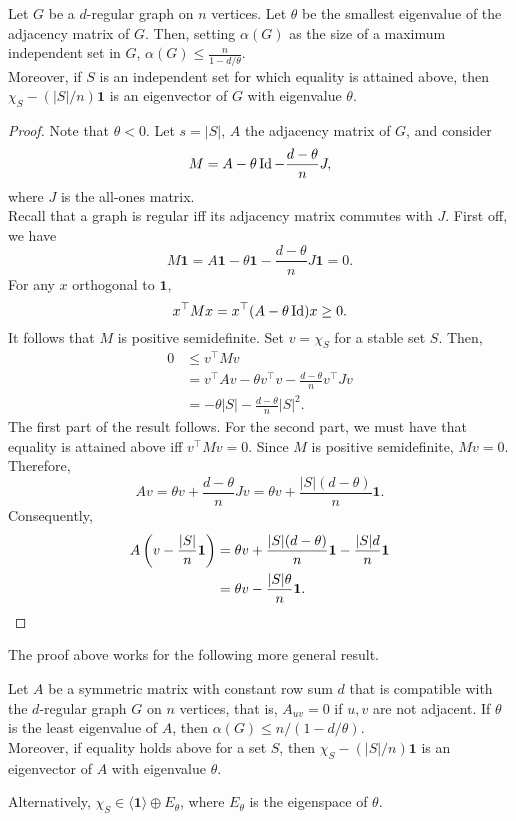 \begin{flem}
	\label{lem:ratio-bound}
	Let $G$ be a $d$-regular graph on $n$ vertices. Let $\theta$ be the smallest eigenvalue of the adjacency matrix of $G$. Then, setting $\alpha(G)$ as the size of a maximum independent set in $G$, $\alpha(G) \le \frac{n}{1-d/\theta}$.\\
	Moreover, if $S$ is an independent set for which equality is attained above, then $\chi_S - (|S|/n) \mathbf{1}$ is an eigenvector of $G$ with eigenvalue $\theta$.
\end{flem}
\begin{proof}
	Note that $\theta < 0$. Let $s = |S|$, $A$ the adjacency matrix of $G$, and consider
	\[ M = A - \theta \operatorname{Id} - \frac{d-\theta}{n}J, \]
	where $J$ is the all-ones matrix.\\
	Recall that a graph is regular iff its adjacency matrix commutes with $J$. First off, we have
	\[ M \mathbf{1} = A \mathbf{1} - \theta \mathbf{1} - \frac{d-\theta}{n} J \mathbf{1} = 0. \]
	For any $x$ orthogonal to $\mathbf{1}$,
	\[ x^\top M x = x^\top(A-\theta \operatorname{Id})x \ge 0. \]
	It follows that $M$ is positive semidefinite. Set $v = \chi_S$ for a stable set $S$. Then,
	\begin{align*}
		0 &\le v^\top M v \\
			&= v^\top A v - \theta v^\top v - \frac{d-\theta}{n} v^\top J v \\
			&= -\theta |S| - \frac{d-\theta}{n}|S|^2.
	\end{align*}
	The first part of the result follows. For the second part, we must have that equality is attained above iff $v^\top M v = 0$. Since $M$ is positive semidefinite, $Mv = 0$. Therefore,
	\[ Av = \theta v + \frac{d-\theta}{n} Jv = \theta v + \frac{|S|(d-\theta)}{n} \mathbf{1}. \]
	Consequently,
	\begin{align*}
		A\left(v - \frac{|S|}{n} \mathbf{1}\right) &= \theta v + \frac{|S|(d-\theta)}{n} \mathbf{1} - \frac{|S|d}{n} \mathbf{1} \\
			&= \theta v - \frac{|S|\theta}{n} \mathbf{1}. \qedhere
	\end{align*}
\end{proof}

The proof above works for the following more general result.

\begin{flem}
	Let $A$ be a symmetric matrix with constant row sum $d$ that is compatible with the $d$-regular graph $G$ on $n$ vertices, that is, $A_{uv} = 0$ if $u,v$ are not adjacent. If $\theta$ is the least eigenvalue of $A$, then $\alpha(G) \le n / (1 - d/\theta)$.\\
	Moreover, if equality holds above for a set $S$, then $\chi_S - (|S|/n)\mathbf{1}$ is an eigenvector of $A$ with eigenvalue $\theta$.
\end{flem}
Alternatively, $\chi_S \in \langle \mathbf{1}\rangle \oplus E_\theta$, where $E_\theta$ is the eigenspace of $\theta$.\\

